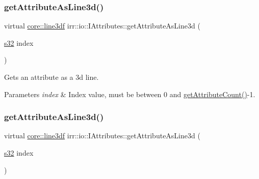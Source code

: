 \subsubsection{\texorpdfstring{get\+Attribute\+As\+Line3d()}{getAttributeAsLine3d()}\hspace{0.1cm}{\footnotesize\ttfamily [3/4]}}
{\footnotesize\ttfamily virtual \hyperlink{namespaceirr_1_1core_acadb288f9aca3bf2d1222abcdf77114e}{core\+::line3df} irr\+::io\+::\+I\+Attributes\+::get\+Attribute\+As\+Line3d (\begin{DoxyParamCaption}\item[{\hyperlink{namespaceirr_ac66849b7a6ed16e30ebede579f9b47c6}{s32}}]{index }\end{DoxyParamCaption})\hspace{0.3cm}{\ttfamily [pure virtual]}}



Gets an attribute as a 3d line. 


\begin{DoxyParams}{Parameters}
{\em index} & Index value, must be between 0 and \hyperlink{classirr_1_1io_1_1IAttributes_a796bdd9440ee7ba0b6742a90a82870b6}{get\+Attribute\+Count()}-\/1. \\
\hline
\end{DoxyParams}
\mbox{\label{classirr_1_1io_1_1IAttributes_ab6cc3141c7d5bd82ade97c7da899d025}} 
\subsubsection{\texorpdfstring{get\+Attribute\+As\+Line3d()}{getAttributeAsLine3d()}\hspace{0.1cm}{\footnotesize\ttfamily [4/4]}}
{\footnotesize\ttfamily virtual \hyperlink{namespaceirr_1_1core_acadb288f9aca3bf2d1222abcdf77114e}{core\+::line3df} irr\+::io\+::\+I\+Attributes\+::get\+Attribute\+As\+Line3d (\begin{DoxyParamCaption}\item[{\hyperlink{namespaceirr_ac66849b7a6ed16e30ebede579f9b47c6}{s32}}]{index }\end{DoxyParamCaption})\hspace{0.3cm}{\ttfamily [pure virtual]}}



